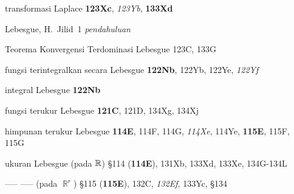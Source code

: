 










\indexheader{\Krein}



















\indexmedskip





transformasi Laplace {\bf 123Xc}, {\it 123Yb}, {\bf 133Xd}






















Lebesgue, H.\   Jilid\ 1 {\it pendahuluan}











Teorema Konvergensi Terdominasi Lebesgue 123C, 133G



fungsi terintegralkan secara Lebesgue {\bf 122Nb}, 122Yb, 122Ye, {\it
122Yf}

integral Lebesgue {\bf 122Nb}

fungsi terukur Lebesgue {\bf 121C}, 121D, 134Xg, 134Xj

himpunan terukur Lebesgue {\bf 114E}, 114F, 114G, {\it 114Xe}, 114Ye, {\bf
115E}, 115F, 115G

ukuran Lebesgue (pada $\Bbb R$) \S114 ({\bf 114E}), 131Xb, 133Xd, 133Xe,
134G-134L


----- ----- (pada $\BbbR^r$) \S115 ({\bf 115E}), 132C, {\it 132Ef}, 133Yc,
\S134




